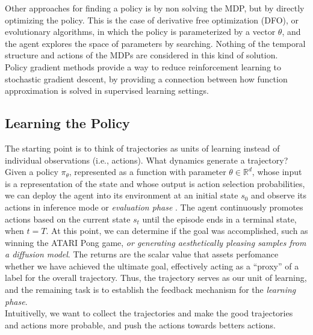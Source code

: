 \noindent Other approaches for finding a policy is by non solving the MDP, 
but by directly optimizing the policy. This is the case of derivative free
optimization (DFO), or evolutionary algorithms, in which the policy is parameterized by a vector $\theta$, and the agent explores the space of parameters by searching. Nothing of the temporal structure and actions of the MDPs are considered in this kind of solution. \\

\noindent Policy gradient methods provide a way to reduce reinforcement learning to stochastic gradient descent, by providing a connection between
how function approximation is solved in supervised learning settings.

\subsection{Learning the Policy}

The starting point is to think of trajectories as units of learning instead of individual observations (i.e., actions). What dynamics generate a trajectory? 
Given a policy $\pi_{\theta}$, represented as a function with parameter $\theta\in \mathbb{R}^{d}$, whose input is a representation of the state and whose output is action selection probabilities, we can deploy the agent into its environment at an initial state $s_0$ and observe its actions in inference mode or \textit{evaluation phase} \citep{sutton1999policy}. The agent continuously promotes actions based on the current state $s_{t}$ until the episode ends in a terminal state, when $t=T$. At this point, we can determine if the goal was accomplished, such as winning the ATARI Pong game, \textit{or generating aesthetically pleasing samples from a diffusion model}. 
The returns are the scalar value that assets perfomance whether we have achieved the ultimate goal, effectively acting as a ``proxy'' of a label for the overall trajectory. Thus, the trajectory serves as our unit of learning, and the remaining task is to establish the feedback mechanism for the \textit{learning phase}. \\

\noindent Intuitivelly, we want to collect the trajectories and make the good trajectories and actions more probable, and push the actions towards betters actions. \\

